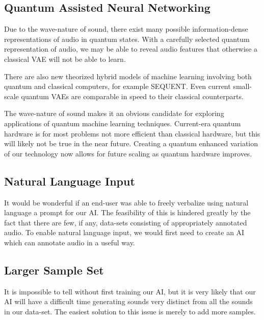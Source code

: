 \documentclass{article}
\begin{document}
\subsection{Quantum Assisted Neural Networking}

Due to the wave-nature of sound, there exist many possible information-dense representations of audio in quantum states. \cite{Itaborai2022} With a carefully selected quantum representation of audio, we may be able to reveal audio features that otherwise a classical VAE will not be able to learn. \cite{Rocchetto2018}

There are also new theorized hybrid models of machine learning involving both quantum and classical computers, for example SEQUENT. \cite{Altmann2023} Even current small-scale quantum VAEs are comparable in speed to their classical counterparts. \cite{Khoshaman2019}

The wave-nature of sound makes it an obvious candidate for exploring applications of quantum machine learning techniques. Current-era quantum hardware is for most problems not more efficient than classical hardware, but this will likely not be true in the near future. Creating a quantum enhanced variation of our technology now allows for future scaling as quantum hardware improves.

\subsection{Natural Language Input}

It would be wonderful if an end-user was able to freely verbalize using natural language a prompt for our AI. The feasibility of this is hindered greatly by the fact that there are few, if any, data-sets consisting of appropriately annotated audio. To enable natural language input, we would first need to create an AI which can annotate audio in a useful way.

\subsection{Larger Sample Set}

It is impossible to tell without first training our AI, but it is very likely that our AI will have a difficult time generating sounds very distinct from all the sounds in our data-set. The easiest solution to this issue is merely to add more samples.


\medskip



\printbibliography
\end{document}
